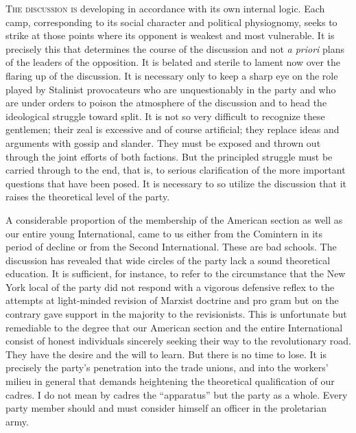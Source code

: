 \newcommand{\documentnumber}[1]{
  \subsection*{\parbox{\linewidth}{\centering #1}}
}

\label{1940-01-24_from-a-scratch-to-the-danger-of-gangrene}


\noindent
\textsc{The discussion is} developing in accordance with its own internal logic. Each camp, corresponding to its social character and political physiognomy, seeks to strike at those points where its opponent is weakest and most vulnerable. It is precisely this that determines the course of the discussion and not \emph{a priori} plans of the leaders of the opposition. It is belated and sterile to lament now over the flaring up of the discussion. It is necessary only to keep a sharp eye on the role played by Stalinist provocateurs who are unquestionably in the party and who are under orders to poison the atmosphere of the discussion and to head the ideological struggle toward split. It is not so very difficult to recognize these gentlemen; their zeal is excessive and of course artificial; they replace ideas and arguments with gossip and slander. They must be exposed and thrown out through the joint efforts of both factions. But the principled struggle must be carried through to the end, that is, to serious clarification of the more important questions that have been posed. It is necessary to so utilize the discussion that it raises the theoretical level of the party.

A considerable proportion of the membership of the American section as well as our entire young International, came to us either from the Comintern in its period of decline or from the Second International. These are bad schools. The discussion has revealed that wide circles of the party lack a sound theoretical education. It is sufficient, for instance, to refer to the circumstance that the New York local of the party did not respond with a vigorous defensive reflex to the attempts at light-minded revision of Marxist doctrine and pro gram but on the contrary gave support in the majority to the revisionists. This is unfortunate but remediable to the degree that our American section and the entire International consist of honest individuals sincerely seeking their way to the revolutionary road. They have the desire and the will to learn. But there is no time to lose. It is precisely the party’s penetration into the trade unions, and into the workers’ milieu in general that demands heightening the theoretical qualification of our cadres. I do not mean by cadres the “apparatus” but the party as a whole. Every party member should and must consider himself an officer in the proletarian army.

